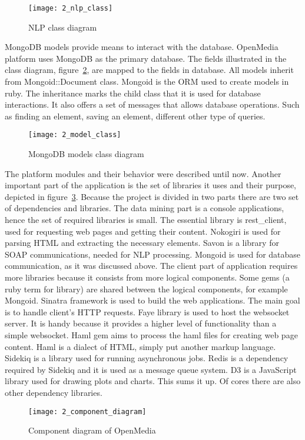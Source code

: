 \begin{figure}[!h]
\centering
\vspace*{0.6cm}
\texttt{[image: 2\_nlp\_class]}
\caption{NLP class diagram}\label{nlp_class}
\end{figure}

MongoDB models provide means to interact with the database. OpenMedia platform uses MongoDB as the primary database. The fields illustrated in the class diagram, \mbox{figure \ref{model_class}}, are mapped to the fields in database. All models inherit from Mongoid::Document class. Mongoid is the ORM used to create models in ruby. The inheritance marks the child class that it is used for database interactions. It also offers a set of messages that allows database operations. Such as finding an element, saving an element, different other type of queries.

\begin{figure}[!h]
\centering
\texttt{[image: 2\_model\_class]}
\caption{MongoDB models class diagram}\label{model_class}
\end{figure}

The platform modules and their behavior were described until now. Another important part of the application is the set of libraries it uses and their purpose, depicted in \mbox{figure \ref{component_diagram}}. Because the project is divided in two parts there are two set of dependencies and libraries. The data mining part is a console applications, hence the set of required libraries is small. The essential library is rest\_client, used for requesting web pages and getting their content. Nokogiri is used for parsing HTML and extracting the necessary elements. Savon is a library for SOAP communications, needed for NLP processing. Mongoid is used for database communication, as it was discussed above. The client part of application requires more libraries because it consists from more logical components. Some gems (a ruby term for library) are shared between the logical components, for example Mongoid. Sinatra framework is used to build the web applications. The main goal is to handle client's HTTP requests. Faye library is used to host the websocket server. It is handy because it provides a higher level of functionality than a simple websocket. Haml gem aims to process the haml files for creating web page content. Haml is a dialect of HTML, simply put another markup language. Sidekiq is a library used for running asynchronous jobs. Redis is a dependency required by Sidekiq and it is used as a message queue system. D3 is a JavaScript library used for drawing plots and charts. This sums it up. Of cores there are also other dependency libraries.
\begin{figure}[!h]
\centering
\texttt{[image: 2\_component\_diagram]}
\caption{Component diagram of OpenMedia}\label{component_diagram}
\end{figure}

